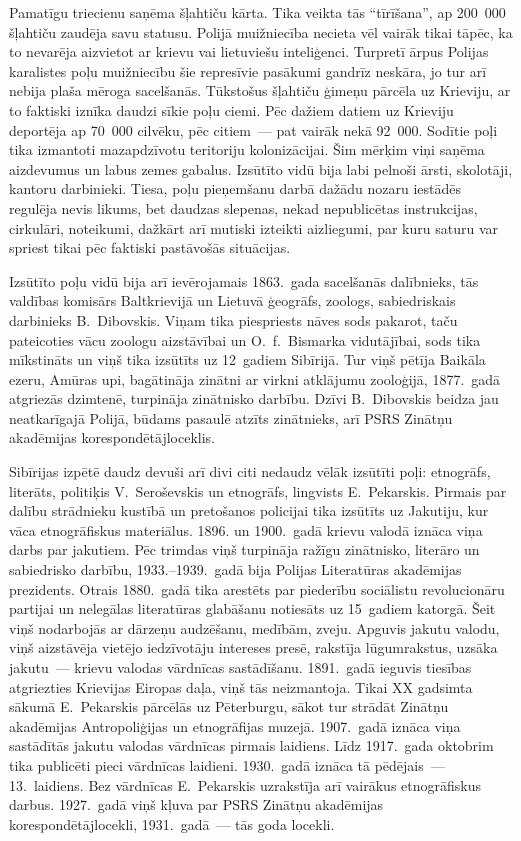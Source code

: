 \documentclass[twoside,a5paper,12pt,fleqn,openany]{extbook}
\begin{document}
Pamatīgu triecienu saņēma šļahtiču kārta. Tika veikta tās ``tīrīšana'', ap 200~000 šļahtiču zaudēja savu statusu. Polijā muižniecība necieta vēl vairāk tikai tāpēc, ka to nevarēja aizvietot ar krievu vai lietuviešu inteliģenci. Turpretī ārpus Polijas karalistes poļu muižniecību šie represīvie pasākumi gandrīz neskāra, jo tur arī nebija plaša mēroga sacelšanās. Tūkstošus šļahtiču ģimeņu pārcēla uz Krieviju, ar to faktiski iznīka daudzi sīkie poļu ciemi. Pēc dažiem datiem uz Krieviju deportēja ap 70~000 cilvēku, pēc citiem~--- pat vairāk nekā 92~000. Sodītie poļi tika izmantoti mazapdzīvotu teritoriju kolonizācijai. Šim mērķim viņi saņēma aizdevumus un labus zemes gabalus. Izsūtīto vidū bija labi pelnoši ārsti, skolotāji, kantoru darbinieki. Tiesa, poļu pieņemšanu darbā dažādu nozaru iestādēs regulēja nevis likums, bet daudzas slepenas, nekad nepublicētas instrukcijas, cirkulāri, noteikumi, dažkārt arī mutiski izteikti aizliegumi, par kuru saturu var spriest tikai pēc faktiski pastāvošās situācijas.

Izsūtīto poļu vidū bija arī ievērojamais 1863.~gada sacelšanās dalībnieks, tās valdības komisārs Baltkrievijā un Lietuvā ģeogrāfs, zoologs, sabiedriskais darbinieks B.~Dibovskis. Viņam tika piespriests nāves sods pakarot, taču pateicoties vācu zoologu aizstāvībai un O.~f.~Bismarka vidutājībai, sods tika mīkstināts un viņš tika izsūtīts uz 12~gadiem Sibīrijā. Tur viņš pētīja Baikāla ezeru, Amūras upi, bagātināja zinātni ar virkni atklājumu zooloģijā, 1877.~gadā atgriezās dzimtenē, turpināja zinātnisko darbību. Dzīvi B.~Dibovskis beidza jau neatkarīgajā Polijā, būdams pasaulē atzīts zinātnieks, arī PSRS Zinātņu akadēmijas korespondētājloceklis.

Sibīrijas izpētē daudz devuši arī divi citi nedaudz vēlāk izsūtīti poļi: etnogrāfs, literāts, politiķis V.~Seroševskis un etnogrāfs, lingvists E.~Pekarskis. Pirmais par dalību strādnieku kustībā un pretošanos policijai tika izsūtīts uz Jakutiju, kur vāca etnogrāfiskus materiālus. 1896. un 1900.~gadā krievu valodā iznāca viņa darbs par jakutiem. Pēc trimdas viņš turpināja ražīgu zinātnisko, literāro un sabiedrisko darbību, 1933.--1939.~gadā bija Polijas Literatūras akadēmijas prezidents. Otrais 1880.~gadā tika arestēts par piederību sociālistu revolucionāru partijai un nelegālas literatūras glabāšanu notiesāts uz 15~gadiem katorgā. Šeit viņš nodarbojās ar dārzeņu audzēšanu, medībām, zveju. Apguvis jakutu valodu, viņš aizstāvēja vietējo iedzīvotāju intereses presē, rakstīja lūgumrakstus, uzsāka jakutu~--- krievu valodas vārdnīcas sastādīšanu. 1891.~gadā ieguvis tiesības atgriezties Krievijas Eiropas daļa, viņš tās neizmantoja. Tikai XX gadsimta sākumā E.~Pekarskis pārcēlās uz Pēterburgu, sākot tur strādāt Zinātņu akadēmijas Antropoliģijas un etnogrāfijas muzejā. 1907.~gadā iznāca viņa sastādītās jakutu valodas vārdnīcas pirmais laidiens. Līdz 1917.~gada oktobrim tika publicēti pieci vārdnīcas laidieni. 1930.~gadā iznāca tā pēdējais~--- 13.~laidiens. Bez vārdnīcas E.~Pekarskis uzrakstīja arī vairākus etnogrāfiskus darbus. 1927.~gadā viņš kļuva par PSRS Zinātņu akadēmijas korespondētājlocekli, 1931.~gadā~--- tās goda locekli.
\end{document}
